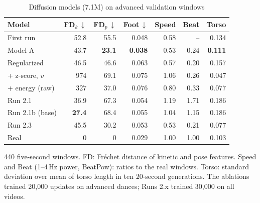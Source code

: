 \documentclass[conference,letterpaper]{IEEEtran}
\begin{document}
\begin{table}[t]
\caption{Diffusion models (7.1M) on advanced validation windows}
\label{tab:pilot}
\centering
\setlength{\tabcolsep}{3.2pt}
\begin{tabular}{lrrrrrr}
\toprule
Model & FD$_k$\,$\downarrow$ & FD$_p$\,$\downarrow$ & Foot\,$\downarrow$ & Speed & Beat & Torso \\
\midrule
First run & 52.8 & 55.5 & 0.048 & 0.58 & -- & 0.134 \\
Model A & 43.7 & \textbf{23.1} & \textbf{0.038} & 0.53 & 0.24 & \textbf{0.111} \\
Regularized & 46.5 & 46.6 & 0.063 & 0.57 & 0.20 & 0.157 \\
+ z-score, $v$ & 974 & 69.1 & 0.075 & 1.06 & 0.26 & 0.047 \\
+ energy (raw) & 327 & 37.0 & 0.076 & 0.80 & 0.33 & 0.077 \\
Run 2.1 & 36.9 & 67.3 & 0.054 & 1.19 & 1.71 & 0.186 \\
Run 2.1b (base) & \textbf{27.4} & 68.4 & 0.055 & 1.04 & 1.15 & 0.186 \\
Run 2.3 & 45.5 & 30.2 & 0.053 & 0.53 & 0.21 & 0.077 \\
\midrule
Real & 0 & 0 & 0.029 & 1.00 & 1.00 & 0.103 \\
\bottomrule
\end{tabular}

\vspace{2pt}
\begin{minipage}{\columnwidth}
\footnotesize 440 five-second windows. FD: Fr\'echet distance of kinetic and pose features. Speed and Beat (1--4\,Hz power, BeatPow): ratios to the real windows. Torso: standard deviation over mean of torso length in ten 20-second generations. The ablations trained 20,000 updates on advanced dances; Runs 2.x trained 30,000 on all videos.
\end{minipage}
\end{table}
\end{document}
